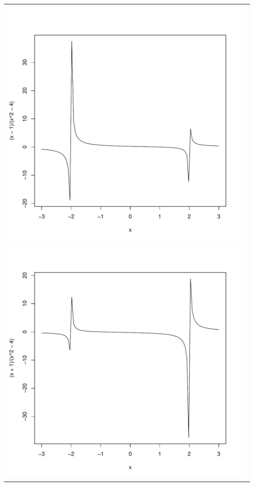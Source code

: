 \documentclass[12pt,b5paper]{ltjsarticle}
\begin{document}
\begin{tabular}{c|c}
 \begin{minipage}{200pt}
  $a=-1$\\
  \includegraphics[scale=.35]{m1.pdf}
 \end{minipage} &
 \begin{minipage}{200pt}
  $a=1$\\
  \includegraphics[scale=.35]{p1.pdf}

\end{minipage}
\end{tabular}
\end{document}
